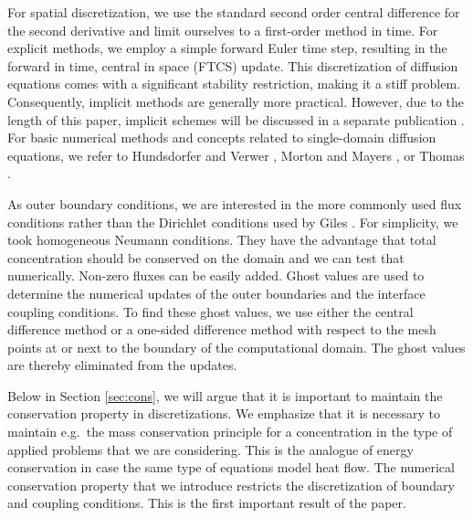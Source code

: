 For spatial discretization, we use the standard second order central difference for the second derivative and limit ourselves to a first-order 
method in time. For explicit methods, we employ a simple forward Euler time step, resulting in the forward in time, central in space (FTCS) update. This 
discretization of diffusion equations comes with a significant stability restriction, making it a stiff problem. Consequently, implicit methods are 
generally more practical. However, due to the length of this paper, implicit schemes will be discussed in a separate publication \cite{CMW3}. For basic 
numerical methods and concepts related to single-domain diffusion equations, we refer to Hundsdorfer and Verwer \cite{bHUVE}, Morton and Mayers \cite{bMOMA}, or Thomas \cite{bTHO}.
 
As outer boundary conditions, we are interested in the more commonly used flux conditions rather than the Dirichlet conditions
used by Giles \cite{GIL}. For simplicity, we took
homogeneous Neumann conditions. They have the advantage that total concentration should be conserved on the domain 
and we can test that numerically.
Non-zero fluxes can be easily added. 
Ghost values are used to determine the numerical updates of the outer boundaries and the interface coupling 
conditions. To find these ghost values, we use either the central difference method or a one-sided
difference method with respect to the mesh points at or next to the boundary of the computational domain. 
The ghost values are thereby eliminated from the updates.

Below in Section \ref{sec:cons}, we will argue that it is important to maintain the conservation property in discretizations.
We emphasize that it is necessary to maintain e.g.\ the mass conservation principle for a concentration
in the type of applied problems that we are considering. 
This is the analogue of energy conservation in case the same type of equations model heat flow. 
The numerical conservation property that we introduce restricts the discretization of boundary and coupling conditions.
This is the first important result of the paper. 

